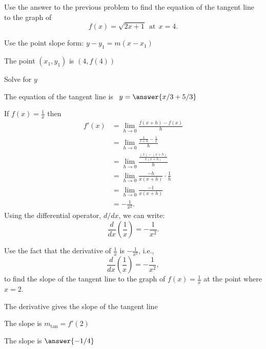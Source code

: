 \documentclass{ximera}
\begin{document}
\begin{problem} %
Use the answer to the previous problem to find the equation of the tangent line to the graph of 
\[
f(x) = \sqrt{2x+1} \ \ \text{at} \ \ x=4.
\]
\begin{hint}
Use the point slope form: $y-y_1 = m(x-x_1)$
\end{hint}
\begin{hint}
The point $(x_1,y_1)$ is $(4, f(4))$
\end{hint}
\begin{hint}
Solve for $y$
\end{hint}
The equation of the tangent line is \ $y = \answer{x/3 + 5/3}$
\end{problem}



\begin{example} %
If $f(x) = \displaystyle{\frac{1}{x}}$ then
\begin{align*}
f'(x) &= \lim_{h \to 0} \frac{f(x+h)-f(x)}{h}\\[5pt]
&= \lim_{h \to 0} \frac{\frac{1}{x+h}- \frac{1}{x}}{h}\\[5pt]
&= \lim_{h \to 0} \frac{\frac{(x) - (x+h)}{x(x+h)}}{h} \\[5pt]
&=  \lim_{h \to 0} \frac{-h}{x(x+h)}\cdot \frac{1}{h}\\[5pt]
&= \lim_{h \to 0} \frac{-1}{x(x+h)} \\[5pt]
&= -\frac{1}{x^2}.
\end{align*}
Using the differential operator, $d/dx$, we can write:
\[
 \frac{d}{dx}\left({\frac{1}{x}}\right) = -\frac{1}{x^2}.
\]
\end{example}


\begin{problem} %
Use the fact that the derivative of $\frac{1}{x}$ is $-\frac{1}{x^2}$,
i.e., 
\[
\frac{d}{dx}\left(\frac{1}{x}\right) = -\frac{1}{x^2},
\]
to find the slope of the tangent line to the graph of 
$f(x) = \frac{1}{x}$ at the point where $x = 2$.\\
\begin{hint}
The derivative gives the slope of the tangent line
\end{hint}
\begin{hint}
The slope is $m_{\text{tan}} = f'(2)$
\end{hint}
The slope is $\answer{-1/4}$
\end{problem}
\end{document}
